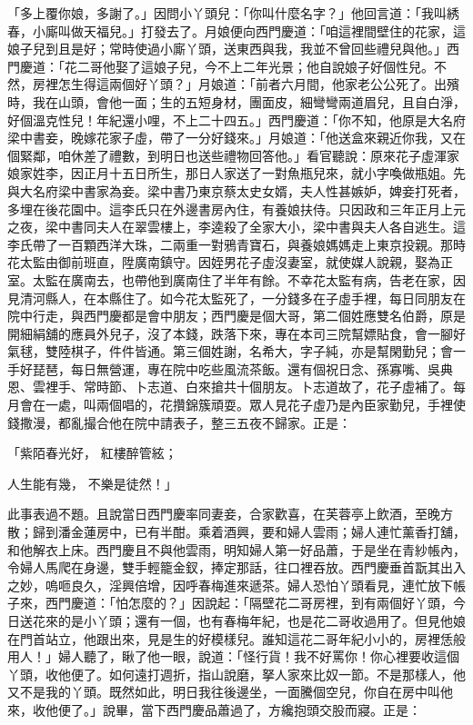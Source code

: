 \begin{showcontents}{}
「多上覆你娘，多謝了。」因問小丫頭兒：「你叫什麼名字？」他回言道：「我叫綉春，小廝叫做天福兒。」打發去了。月娘便向西門慶道：「咱這裡間壁住的花家，這娘子兒到且是好；常時使過小廝丫頭，送東西與我，我並不曾回些禮兒與他。」西門慶道：「花二哥他娶了這娘子兒，今不上二年光景；他自說娘子好個性兒。不然，房裡怎生得這兩個好丫頭？」月娘道：「前者六月間，他家老公公死了。出殯時，我在山頭，會他一面；生的五短身材，團面皮，細彎彎兩道眉兒，且自白淨，好個溫克性兒！年紀還小哩，不上二十四五。」西門慶道：「你不知，他原是大名府梁中書妾，晚嫁花家子虛，帶了一分好錢來。」月娘道：「他送盒來親近你我，又在個緊鄰，咱休差了禮數，到明日也送些禮物回答他。」看官聽說：原來花子虛渾家娘家姓李，因正月十五日所生，那日人家送了一對魚瓶兒來，就小字喚做瓶姐。先與大名府梁中書家為妾。梁中書乃東京蔡太史女婿，夫人性甚嫉妒，婢妾打死者，多埋在後花園中。這李氏只在外邊書房內住，有養娘扶侍。只因政和三年正月上元之夜，梁中書同夫人在翠雲樓上，李逵殺了全家大小，梁中書與夫人各自逃生。這李氏帶了一百顆西洋大珠，二兩重一對鴉青寶石，與養娘媽媽走上東京投親。那時花太監由御前班直，陞廣南鎮守。因姪男花子虛沒妻室，就使媒人說親，娶為正室。太監在廣南去，也帶他到廣南住了半年有餘。不幸花太監有病，告老在家，因見清河縣人，在本縣住了。如今花太監死了，一分錢多在子虛手裡，每日同朋友在院中行走，與西門慶都是會中朋友；西門慶是個大哥，第二個姓應雙名伯爵，原是開細絹舖的應員外兒子，沒了本錢，跌落下來，專在本司三院幫嫖貼食，會一腳好氣毬，雙陸棋子，件件皆通。第三個姓謝，名希大，字子純，亦是幫閑勤兒；會一手好琵琶，每日無營運，專在院中吃些風流茶飯。還有個祝日念、孫寡嘴、吳典恩、雲裡手、常時節、卜志道、白來搶共十個朋友。卜志道故了，花子虛補了。每月會在一處，叫兩個唱的，花攢錦簇頑耍。眾人見花子虛乃是內臣家勤兒，手裡使錢撒漫，都亂撮合他在院中請表子，整三五夜不歸家。正是：

「紫陌春光好，  紅樓醉管絃；

人生能有幾，  不樂是徒然！」

此事表過不題。且說當日西門慶率同妻妾，合家歡喜，在芙蓉亭上飲酒，至晚方散；歸到潘金蓮房中，已有半酣。乘着酒興，要和婦人雲雨；婦人連忙薰香打舖，和他解衣上床。西門慶且不與他雲雨，明知婦人第一好品蕭，于是坐在青紗帳內，令婦人馬爬在身邊，雙手輕籠金釵，捧定那話，往口裡吞放。西門慶垂首翫其出入之妙，嗚咂良久，淫興倍增，因呼春梅進來遞茶。婦人恐怕丫頭看見，連忙放下帳子來，西門慶道：「怕怎麼的？」因說起：「隔壁花二哥房裡，到有兩個好丫頭，今日送花來的是小丫頭；還有一個，也有春梅年紀，也是花二哥收過用了。但見他娘在門首站立，他跟出來，見是生的好模樣兒。誰知這花二哥年紀小小的，房裡恁般用人！」婦人聽了，瞅了他一眼，說道：「怪行貨！我不好罵你！你心裡要收這個丫頭，收他便了。如何遠打週折，指山說磨，拏人家來比奴一節。不是那樣人，他又不是我的丫頭。既然如此，明日我往後邊坐，一面騰個空兒，你自在房中叫他來，收他便了。」說畢，當下西門慶品蕭過了，方纔抱頭交股而寢。正是：


\end{showcontents}
